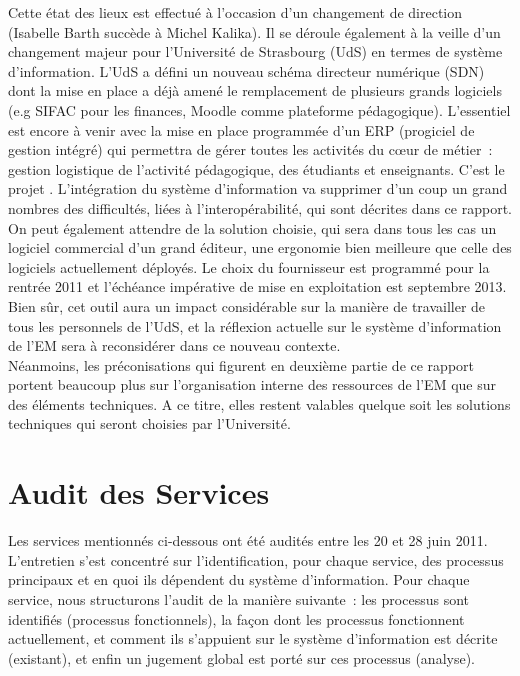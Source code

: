\documentclass{book}
\begin{document}
Cette état  des lieux  est effectué  à l'occasion  d'un changement  de direction
(Isabelle Barth  succède à Michel Kalika).  Il se déroule également  à la veille
d'un  changement majeur  pour  l'Université  de Strasbourg  (UdS)  en termes  de
système  d'information. L'UdS  a défini  un nouveau  schéma directeur  numérique
(SDN) dont  la mise en  place a déjà amené  le remplacement de  plusieurs grands
logiciels (e.g  SIFAC pour les  finances, Moodle comme  plateforme pédagogique).
L'essentiel  est encore  à  venir avec  la  mise en  place  programmée d'un  ERP
(progiciel de  gestion intégré) qui permettra  de gérer toutes les  activités du
c{\oe}ur de métier~: gestion logistique de l'activité pédagogique, des étudiants
et  enseignants.  C'est  le  projet .  L'intégration  du  système
d'information va supprimer  d'un coup un grand nombres des  difficultés, liées à
l'interopérabilité,  qui  sont décrites  dans  ce  rapport.  On  peut  également
attendre  de  la solution  choisie,  qui  sera dans  tous  les  cas un  logiciel
commercial  d'un grand  éditeur,  une  ergonomie bien  meilleure  que celle  des
logiciels actuellement déployés.  Le choix  du fournisseur est programmé pour la
rentrée  2011 et  l'échéance impérative  de mise  en exploitation  est septembre
2013.\\

Bien sûr, cet outil aura un impact considérable sur la manière de travailler
de tous les personnels de l'UdS, et la réflexion actuelle sur le système
d'information de l'EM sera à reconsidérer dans ce nouveau contexte.\\

Néanmoins,  les préconisations  qui figurent  en deuxième  partie de  ce rapport
portent beaucoup plus sur l'organisation interne  des ressources de l'EM que sur
des éléments  techniques. A ce  titre, elles  restent valables quelque  soit les
solutions techniques qui seront choisies par l'Université.


 

\chapter{Audit des Services}
 
Les services mentionnés ci-dessous ont été audités entre les 20 et 28 juin 2011.
L'entretien  s'est  concentré sur  l'identification,  pour  chaque service,  des
processus principaux  et en  quoi ils dépendent  du système  d'information. Pour
chaque service, nous structurons l'audit  de la manière suivante~: les processus
sont  identifiés   (processus  fonctionnels),   la  façon  dont   les  processus
fonctionnent   actuellement,  et   comment   ils  s'appuient   sur  le   système
d'information est décrite (existant), et enfin  un jugement global est porté sur
ces processus (analyse).
\end{document}

